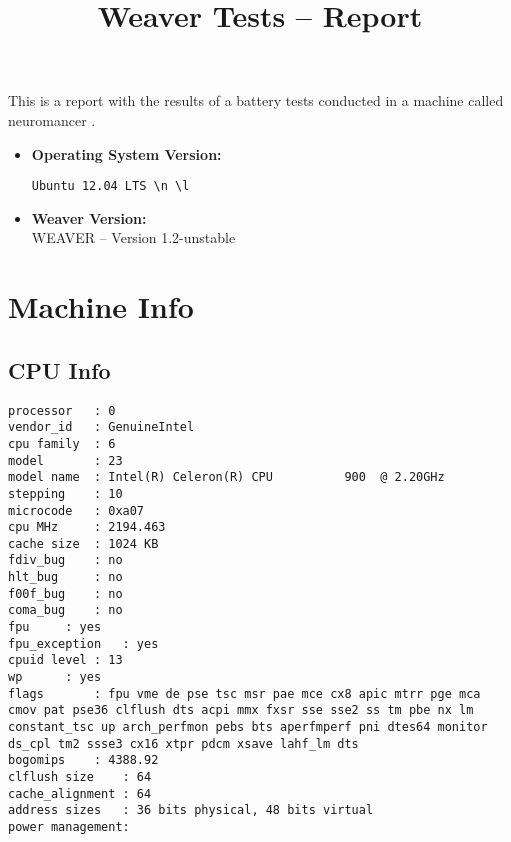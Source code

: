\documentclass{article}
\title{Weaver Tests -- Report}
\begin{document}
\maketitle
This is a report with the results of a battery
tests conducted in a machine called 
neuromancer
.
\begin{itemize}
\item
\textbf{Operating System Version: }
\begin{verbatim}
Ubuntu 12.04 LTS \n \l

\end{verbatim}
\item
\textbf{Weaver Version: }\\
WEAVER -- Version 1.2-unstable
\end{itemize}
\section{Machine Info}
\subsection{CPU Info}
\begin{verbatim}
processor	: 0
vendor_id	: GenuineIntel
cpu family	: 6
model		: 23
model name	: Intel(R) Celeron(R) CPU          900  @ 2.20GHz
stepping	: 10
microcode	: 0xa07
cpu MHz		: 2194.463
cache size	: 1024 KB
fdiv_bug	: no
hlt_bug		: no
f00f_bug	: no
coma_bug	: no
fpu		: yes
fpu_exception	: yes
cpuid level	: 13
wp		: yes
flags		: fpu vme de pse tsc msr pae mce cx8 apic mtrr pge mca cmov pat pse36 clflush dts acpi mmx fxsr sse sse2 ss tm pbe nx lm constant_tsc up arch_perfmon pebs bts aperfmperf pni dtes64 monitor ds_cpl tm2 ssse3 cx16 xtpr pdcm xsave lahf_lm dts
bogomips	: 4388.92
clflush size	: 64
cache_alignment	: 64
address sizes	: 36 bits physical, 48 bits virtual
power management:

\end{verbatim}
\end{document}
